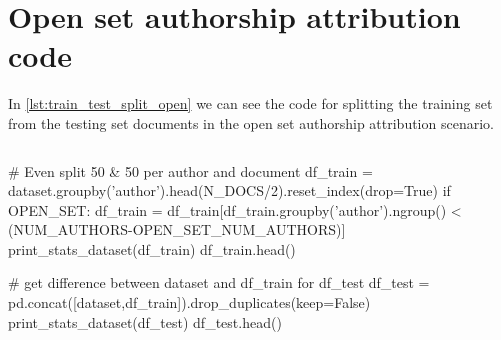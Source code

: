 \section{Open set authorship attribution code}

In \autoref{lst:train_test_split_open} we can see the code for splitting the training set from the testing set documents in the open set authorship attribution scenario.

\begin{lstlisting}[frame=none,caption={Training and Testing set split for open set autorship attribution.},captionpos=b,label=lst:train_test_split_open]
\end{lstlisting}
\begin{python}	
	# Even split 50 & 50 per author and document
	df_train = dataset.groupby('author').head(N_DOCS/2).reset_index(drop=True)
	if OPEN_SET:
		df_train = df_train[df_train.groupby('author').ngroup() < (NUM_AUTHORS-OPEN_SET_NUM_AUTHORS)]
	print_stats_dataset(df_train)
	df_train.head()
	
	# get difference between dataset and df_train for df_test
	df_test = pd.concat([dataset,df_train]).drop_duplicates(keep=False)
	print_stats_dataset(df_test)
	df_test.head()
\end{python}

\listoffigures
\listoftables
